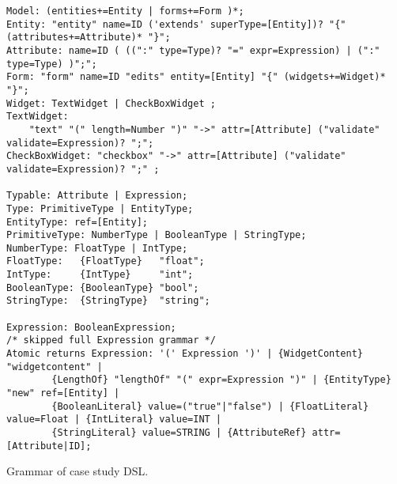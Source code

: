 % 
% 


% 

%

\begin{listing}[tb]
\begin{lstlisting}[language=xtext] 
Model: (entities+=Entity | forms+=Form )*;
Entity: "entity" name=ID ('extends' superType=[Entity])? "{" (attributes+=Attribute)* "}";
Attribute: name=ID ( ((":" type=Type)? "=" expr=Expression) | (":" type=Type) )";";
Form: "form" name=ID "edits" entity=[Entity] "{" (widgets+=Widget)* "}";
Widget: TextWidget | CheckBoxWidget ;
TextWidget:
	"text" "(" length=Number ")" "->" attr=[Attribute] ("validate" validate=Expression)? ";";
CheckBoxWidget: "checkbox" "->" attr=[Attribute] ("validate" validate=Expression)? ";" ;

Typable: Attribute | Expression;
Type: PrimitiveType | EntityType;
EntityType: ref=[Entity];
PrimitiveType: NumberType | BooleanType | StringType;
NumberType: FloatType | IntType;
FloatType:   {FloatType}   "float";
IntType:     {IntType}     "int";
BooleanType: {BooleanType} "bool";
StringType:	 {StringType}  "string";

Expression: BooleanExpression;
/* skipped full Expression grammar */
Atomic returns Expression: '(' Expression ')' | {WidgetContent} "widgetcontent" |
		{LengthOf} "lengthOf" "(" expr=Expression ")" | {EntityType} "new" ref=[Entity] | 
		{BooleanLiteral} value=("true"|"false") | {FloatLiteral} value=Float | {IntLiteral} value=INT |
		{StringLiteral} value=STRING | {AttributeRef} attr=[Attribute|ID];
\end{lstlisting}
\caption{Grammar of case study DSL.}
\label{lst:grammar-plain}
\end{listing}

